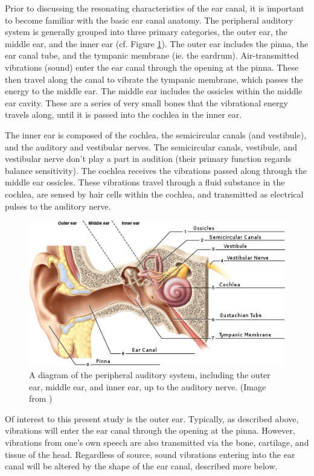 \documentclass[dissertation,copyright]{uathesis}
\begin{document}
Prior to discussing the resonating characteristics of the ear canal, it is important to become familiar with the basic ear canal anatomy.  The peripheral auditory system is generally grouped into three primary categories, the outer ear, the middle ear, and the inner ear (cf. Figure \ref{fig:ear-anatomy}).  The outer ear includes the pinna, the ear canal tube, and the tympanic membrane (ie. the eardrum).  Air-transmitted vibrations (sound) enter the ear canal through the opening at the pinna.  These then travel along the canal to vibrate the tympanic membrane, which passes the energy to the middle ear.  The middle ear includes the ossicles within the middle ear cavity.  These are a series of very small bones that the vibrational energy travels along, until it is passed into the cochlea in the inner ear.

The inner ear is composed of the cochlea, the semicircular canals (and vestibule), and the auditory and vestibular nerves.  The semicircular canals, vestibule, and vestibular nerve don't play a part in audition (their primary function regards balance sensitivity).  The cochlea receives the vibrations passed along through the middle ear ossicles.  These vibrations travel through a fluid substance in the cochlea, are sensed by hair cells within the cochlea, and transmitted as electrical pulses to the auditory nerve.

\begin{figure}[h]
\centering
  \includegraphics{figure/ear_anatomy.png}
  \caption{A diagram of the peripheral auditory system, including the outer ear, middle ear, and inner ear, up to the auditory nerve. (Image from \cite{martin:12})}
  \label{fig:ear-anatomy}
\end{figure}

Of interest to this present study is the outer ear.  Typically, as described above, vibrations will enter the ear canal through the opening at the pinna.  However, vibrations from one's own speech are also transmitted via the bone, cartilage, and tissue of the head.  Regardless of source, sound vibrations entering into the ear canal will be altered by the shape of the ear canal, described more below.
\end{document}

